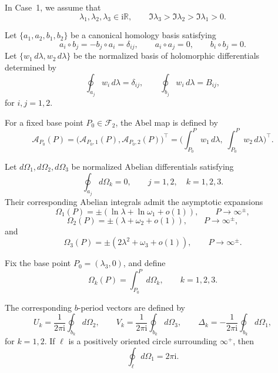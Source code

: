 \documentclass{amsart}
\numberwithin{equation}{hw}
\begin{document}
In Case~1, we assume that
\[
\lambda_1,\lambda_2,\lambda_3\in \mathrm{i}\mathbb{R},
\qquad
\Im \lambda_3>\Im \lambda_2>\Im \lambda_1>0 .
\]

Let \(\{a_1,a_2,b_1,b_2\}\) be a canonical homology basis satisfying
\[
a_i\circ b_j
=
-
b_j\circ a_i
=
\delta_{ij},
\qquad
a_i\circ a_j
=
0,
\qquad
b_i\circ b_j
=
0 .
\]
Let \(\{w_1\,d\lambda,w_2\,d\lambda\}\) be the normalized basis of holomorphic differentials determined by
\begin{equation}
\oint_{a_j} w_i\,d\lambda
=
\delta_{ij},
\qquad
\oint_{b_j} w_i\,d\lambda
=
B_{ij},
\label{eq:normalized-differentials}
\end{equation}
for \(i,j=1,2\).

For a fixed base point \(P_0\in\mathscr{F}_2\), the Abel map is defined by
\begin{equation}
\mathcal{A}_{P_0}(P)
=
\bigl(
\mathcal{A}_{P_0,1}(P),
\mathcal{A}_{P_0,2}(P)
\bigr)^{\top}
=
\Biggl(
\int_{P_0}^{P} w_1\,d\lambda,
\;
\int_{P_0}^{P} w_2\,d\lambda
\Biggr)^{\top}.
\label{eq:Abel-map}
\end{equation}

Let \(d\Omega_1,d\Omega_2,d\Omega_3\) be normalized Abelian differentials satisfying
\begin{equation}
\oint_{a_j} d\Omega_k
=
0,
\qquad
j=1,2,
\quad
k=1,2,3.
\label{eq:a-normalization}
\end{equation}
Their corresponding Abelian integrals admit the asymptotic expansions
\begin{equation}
\Omega_1(P)
=
\pm\left(
\ln \lambda
+
\ln \omega_1
+
o(1)
\right),
\qquad
P\to\infty^\pm,
\label{eq:Omega1-asymptotic}
\end{equation}
\begin{equation}
\Omega_2(P)
=
\pm\left(
\lambda
+
\omega_2
+
o(1)
\right),
\qquad
P\to\infty^\pm,
\label{eq:Omega2-asymptotic}
\end{equation}
and
\begin{equation}
\Omega_3(P)
=
\pm\left(
2\lambda^2
+
\omega_3
+
o(1)
\right),
\qquad
P\to\infty^\pm.
\label{eq:Omega3-asymptotic}
\end{equation}

Fix the base point \(P_0=(\lambda_3,0)\), and define
\begin{equation}
\Omega_k(P)
=
\int_{P_0}^{P} d\Omega_k,
\qquad
k=1,2,3.
\label{eq:Omega-definition}
\end{equation}

The corresponding \(b\)-period vectors are defined by
\begin{equation}
U_k
=
\frac{1}{2\pi\mathrm{i}}
\oint_{b_k} d\Omega_2,
\qquad
V_k
=
\frac{1}{2\pi\mathrm{i}}
\oint_{b_k} d\Omega_3,
\qquad
\Delta_k
=
-
\frac{1}{2\pi\mathrm{i}}
\oint_{b_k} d\Omega_1,
\label{eq:period-vectors}
\end{equation}
for \(k=1,2\). If \(\ell\) is a positively oriented circle surrounding \(\infty^+\), then
\begin{equation}
\oint_{\ell} d\Omega_1
=
2\pi\mathrm{i}.
\label{eq:Omega1-cycle}
\end{equation}
\end{document}
